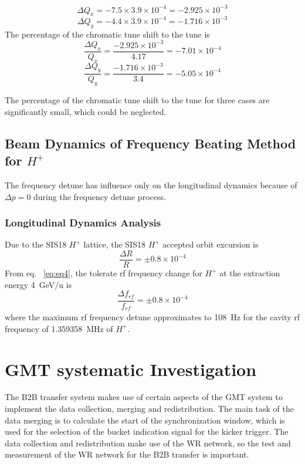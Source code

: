 \begin{equation}
\Delta Q_x = -7.5\times 3.9\times 10^{-4}=-2.925 \times 10^{-3}
\end{equation}
\begin{equation}
\Delta Q_y = -4.4\times 3.9\times 10^{-4}=-1.716\times 10^{-3} 
\end{equation}
The percentage of the chromatic tune shift to the tune is
\begin{equation}
\frac{\Delta Q_x}{Q_x} = \frac{-2.925 \times 10^{-3}}{4.17}=-7.01 \times 10^{-4}
\end{equation}
\begin{equation}
\frac{\Delta Q_y}{Q_y} = \frac{-1.716\times 10^{-3}}{3.4} =-5.05 \times 10^{-4}
\end{equation}

The percentage of the chromatic tune shift to the tune for three cases are significantly small, which could be neglected.

\subsection{Beam Dynamics of Frequency Beating Method for $H^+$} 
The frequency detune has influence only on the longitudinal dynamics because of $\Delta p = 0$ during the frequency detune process.

\subsubsection{Longitudinal Dynamics Analysis}
Due to the SIS18 $H^+$ lattice, the SIS18 $H^+$ accepted orbit excursion is~\cite{liebermann_fair_2013}
\begin{equation}
\frac{\Delta{R}}{R} = \pm 0.8 \times 10^{-4}
\end{equation}
From eq. ~\ref{eq:eq4}, the tolerate rf frequency change for $H^+$ at the extraction energy \SI{4}{GeV/u} is
\begin{equation}
\frac{\Delta{f}_\mathit{rf}}{f_\mathit{rf}} = \pm 0.8 \times 10^{-4}
\end{equation}
where the maximum rf frequency detune approximates to \SI{108}{Hz} for the cavity rf frequency of \SI{1.359358}{MHz} of $H^+$.
\section{GMT systematic Investigation}
The B2B transfer system makes use of certain aspects of the GMT system to implement the data collection, merging and redistribution. The main task of the data merging is to calculate the start of the synchronization window, which is used for the selection of the bucket indication signal for the kicker trigger. The data collection and redistribution make use of the WR network, so the test and measurement of the WR network for the B2B transfer is important. 

